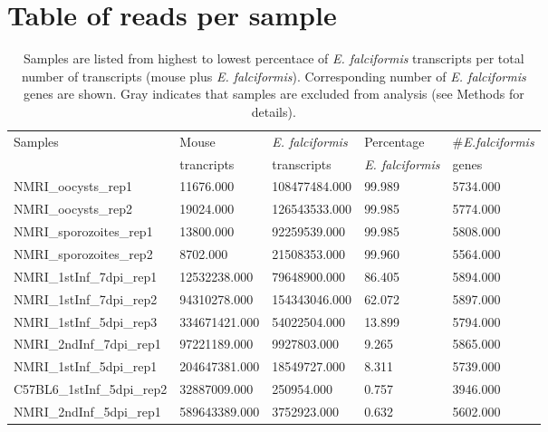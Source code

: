 \documentclass{article}
\begin{document}


\section{Table of reads per sample}
\setlength{\tabcolsep}{10pt}
\begin{table}[H]
\centering 
	\caption{Samples are listed from highest to lowest percentace of \textit{E. falciformis} transcripts per 
	total number of transcripts (mouse plus \textit{E. falciformis}). Corresponding number of
	\textit{E. falciformis} genes are shown. Gray indicates that samples are excluded from 
	analysis (see Methods for details).}
\begin{tabular}{*5l}    \toprule
Samples  & Mouse 	& \textit{E. falciformis}  & Percentage			& \#\textit{E.falciformis} \\
	& trancripts	& transcripts   	 & \textit{E. falciformis}	& genes \\ \midrule
NMRI\_oocysts\_rep1 & 11676.000 & 108477484.000 & 99.989 & 5734.000 \\ 
NMRI\_oocysts\_rep2 & 19024.000 & 126543533.000 & 99.985 & 5774.000 \\ 
NMRI\_sporozoites\_rep1 & 13800.000 & 92259539.000 & 99.985 & 5808.000 \\ 
NMRI\_sporozoites\_rep2 & 8702.000 & 21508353.000 & 99.960 & 5564.000 \\ 
NMRI\_1stInf\_7dpi\_rep1 & 12532238.000 & 79648900.000 & 86.405 & 5894.000 \\ 
NMRI\_1stInf\_7dpi\_rep2 & 94310278.000 & 154343046.000 & 62.072 & 5897.000 \\ 
NMRI\_1stInf\_5dpi\_rep3 & 334671421.000 & 54022504.000 & 13.899 & 5794.000 \\ 
NMRI\_2ndInf\_7dpi\_rep1 & 97221189.000 & 9927803.000 & 9.265 & 5865.000 \\ 
NMRI\_1stInf\_5dpi\_rep1 & 204647381.000 & 18549727.000 & 8.311 & 5739.000 \\ 
C57BL6\_1stInf\_5dpi\_rep2 & 32887009.000 & 250954.000 & 0.757 & 3946.000 \\ 
	{\color{Gray}NMRI\_2ndInf\_5dpi\_rep1} & {\color{Gray} 589643389.000} & {\color{Gray}3752923.000} & {\color{Gray} 0.632} &  {\color{Gray}5602.000} \\ 

\end{tabular}
\end{table}
\end{document}
